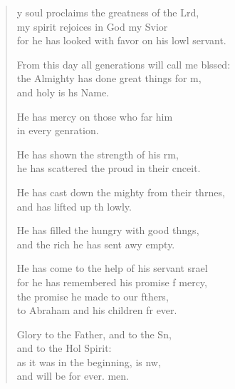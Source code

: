 \begin{verse}
  \begin{patverse}
y soul proclaims the greatness of the Lrd,\Flex\\
my spirit rejoices in God my Svior\Med\\
for he has looked with favor on his lowl servant.

From this day all generations will call me blssed:\Flex\\
the Almighty has done great things for m,\Med\\
and holy is h\pointup{\i}s Name.

He has mercy on those who far him\Med\\
in every genration.

He has shown the strength of his rm,\Med\\
he has scattered the proud in their cnceit.

He has cast down the mighty from their thrnes,\Med\\
and has lifted up th lowly.

He has filled the hungry with good thngs,\Med\\
and the rich he has sent awy empty.

He has come to the help of his servant srael\Med\\
for he has remembered his promise f mercy,\\
the promise he made to our fthers,\Med\\
to Abraham and his children fr ever.

Glory to the Father, and to the Sn,\Med\\
and to the Hol Spirit:\\
as it was in the beginning, is nw,\Med\\
and will be for ever. men.
  \end{patverse}
\end{verse}
